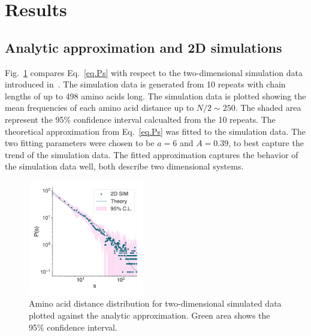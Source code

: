 \documentclass[
reprint,
twocolumn,
amsmath,amssymb,superscriptaddress,aps,
pre]{revtex4-1}
\begin{document}



\section{Results}
\subsection{Analytic approximation and 2D simulations}
Fig.~\ref{fig:2d_sim} compares Eq.~\ref{eq.Ps} with respect to the two-dimensional simulation data introduced in~\cite{molkenthin2020self}. The simulation data is generated from 10 repeats with chain lengths of up to 498 amino acids long. The simulation data is plotted showing the mean frequencies of each amino acid distance up to $N/2\sim250$. The shaded area represent the 95\% confidence interval calcualted from the 10 repeats. The theoretical approximation from Eq.~\ref{eq.Ps} was fitted to the simulation data. The two fitting parameters were chosen to be $a=6$ and $A=0.39$, to best capture the trend of the simulation data. The fitted approximation captures the behavior of the simulation data well, both describe two dimensional systems. 
 \begin{figure}[tb]
        \centering
	\includegraphics[width=0.45\textwidth]{paper/figures/Fig3/Fig3.pdf}
	    \caption{Amino acid distance distribution for two-dimensional simulated data plotted against the analytic approximation. Green area shows the 95\% confidence interval.}
        \label{fig:2d_sim}
\end{figure}
\end{document}
